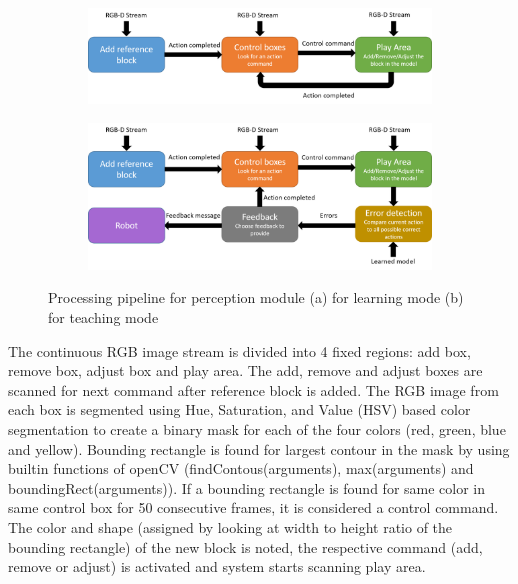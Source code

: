 \begin{figure}[h]
    \begin{subfigure}{1\textwidth}
       \centering
       \includegraphics[width=1\linewidth]{figures/learning_mode.png}
      
       \caption[{Learning mode}]{ \label{fig:fig_3-3a}}
    \end{subfigure}
    \begin{subfigure}{1\textwidth}
       \centering
       \includegraphics[width=1\linewidth]{figures/teaching_mode.png}
      
       \caption[{Teaching mode}]{ \label{fig:fig_3-3b}}
    \end{subfigure}
    \caption[{Processing pipeline}]{Processing pipeline for perception module (a) for learning mode (b) for teaching mode}
   \label{fig:fig_3-3}
\end{figure}
The continuous RGB image stream is divided into 4 fixed regions: add box, remove box, adjust box and play area. The add, remove and adjust boxes are scanned for next command after reference block is added. The RGB image from each box is segmented using Hue, Saturation, and Value (HSV) based color segmentation to create a binary mask for each of the four colors (red, green, blue and yellow). Bounding rectangle is found for largest contour in the mask by using builtin functions of openCV (findContous(arguments), max(arguments) and boundingRect(arguments)). If a bounding rectangle is found for same color in same control box for 50 consecutive frames, it is considered a control command. The color and shape (assigned by looking at width to height ratio of the bounding rectangle) of the new block is noted, the respective command (add, remove or adjust) is activated and system starts scanning play area.
